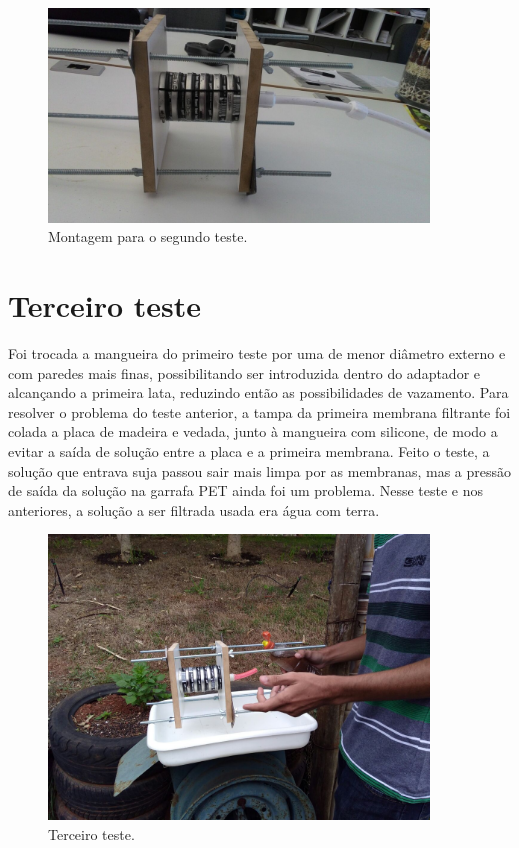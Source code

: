 \begin{figure}[H]
  \centering
  \includegraphics[width=0.9\textwidth]{figuras/segundo_teste.png}
  \caption{Montagem para o segundo teste.\label{fig:segundo_teste}}
\end{figure}


\section{Terceiro teste}\label{sec:terceiro_teste}

Foi trocada a mangueira do primeiro teste por uma de menor diâmetro externo e
com paredes mais finas, possibilitando ser introduzida dentro do adaptador e
alcançando a primeira lata, reduzindo então as possibilidades de vazamento. Para
resolver o problema do teste anterior, a tampa da primeira membrana filtrante
foi colada a placa de madeira e vedada, junto à mangueira com silicone, de modo
a evitar a saída de solução entre a placa e a primeira membrana. Feito o teste,
a solução que entrava suja passou sair mais limpa por as membranas, mas a
pressão de saída da solução na garrafa PET ainda foi um problema. Nesse teste e
nos anteriores, a solução a ser filtrada usada era água com terra.

\begin{figure}[H]
  \centering
  \includegraphics[width=0.9\textwidth]{figuras/terceiro_teste.png}
  \caption{Terceiro teste.\label{fig:terceiro_teste}}
\end{figure}


